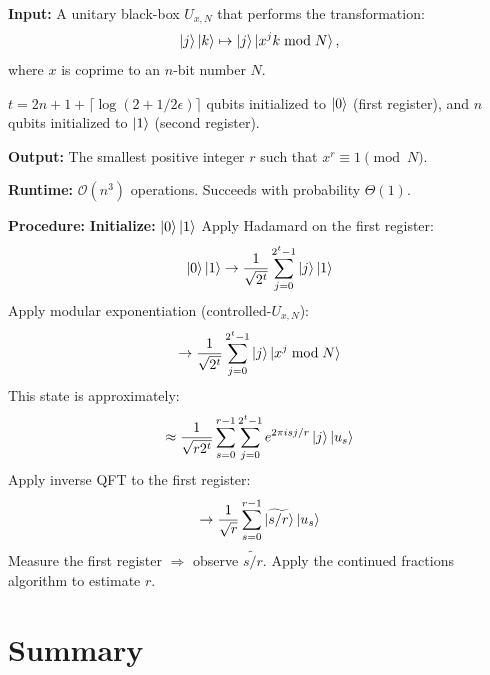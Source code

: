 \begin{algorithm}[H]
    \caption{Quantum Order-Finding Algorithm}
    \begin{algorithmic}[1]
        \State \textbf{Input:} A unitary black-box $U_{x,N}$ that performs the transformation:
        \[
        \ket{j}\ket{k} \mapsto \ket{j}\ket{x^j k \bmod N},
        \]
        where $x$ is coprime to an $n$-bit number $N$.

        \Statex \hspace{1em} $t = 2n + 1 + \lceil \log(2 + 1/2\epsilon) \rceil$ qubits initialized to $\ket{0}$ (first register), and $n$ qubits initialized to $\ket{1}$ (second register).

        \State \textbf{Output:} The smallest positive integer $r$ such that $x^r \equiv 1 \pmod{N}$.

        \State \textbf{Runtime:} $\mathcal{O}(n^3)$ operations. Succeeds with probability $\Theta(1)$.

        \State \textbf{Procedure:}
        \State \hspace{1em} \textbf{Initialize:} $\ket{0}\ket{1}$
        \State \hspace{1em} Apply Hadamard on the first register:
        \[
        \ket{0}\ket{1} \rightarrow \frac{1}{\sqrt{2^t}} \sum_{j=0}^{2^t - 1} \ket{j} \ket{1}
        \]
        \State \hspace{1em} Apply modular exponentiation (controlled-$U_{x,N}$):
        \[
        \rightarrow \frac{1}{\sqrt{2^t}} \sum_{j=0}^{2^t - 1} \ket{j} \ket{x^j \bmod N}
        \]
        \Statex \hspace{1em} This state is approximately:
        \[
        \approx \frac{1}{\sqrt{r 2^t}} \sum_{s=0}^{r-1} \sum_{j=0}^{2^t - 1} e^{2\pi i s j / r} \ket{j} \ket{u_s}
        \]
        \State \hspace{1em} Apply inverse QFT to the first register:
        \[
        \rightarrow \frac{1}{\sqrt{r}} \sum_{s=0}^{r - 1} \ket{\widetilde{s/r}} \ket{u_s}
        \]
        \State \hspace{1em} Measure the first register $\Rightarrow$ observe $\widetilde{s/r}$.
        \State \hspace{1em} Apply the continued fractions algorithm to estimate $r$.
    \end{algorithmic}
\end{algorithm}

\section{Summary}



\chapterreferences
